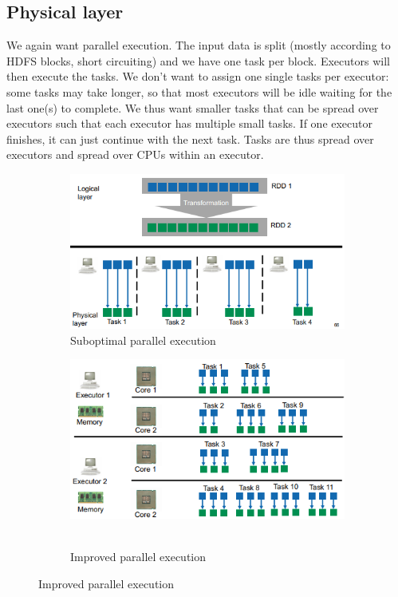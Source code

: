 \documentclass[11pt,oneside,a4paper]{article}
\begin{document}
\newpage

\subsection{Physical layer}

We again want parallel execution. The input data is split (mostly according to HDFS blocks, short circuiting) and we have one task per block. Executors will then execute the tasks. We don't want to assign one single tasks per executor: some tasks may take longer, so that most executors will be idle waiting for the last one(s) to complete. We thus want smaller tasks that can be spread over executors such that each executor has multiple small tasks. If one executor finishes, it can just continue with the next task. Tasks are thus spread over executors and spread over CPUs within an executor. 

\begin{figure}[t!]
	\centering
	\begin{subfigure}[t]{.5\textwidth}
		\centering
		\includegraphics[width=0.7\linewidth]{figures/spark_parallelize_not_ideal}
		\caption{Suboptimal parallel execution }
	\end{subfigure}%
	\begin{subfigure}[t]{.5\textwidth}
		\centering
		\includegraphics[width=0.7\linewidth]{figures/spark_parallelize_ideal}\
		\caption{Improved parallel execution}
	\end{subfigure}
\end{figure}
\end{document}
